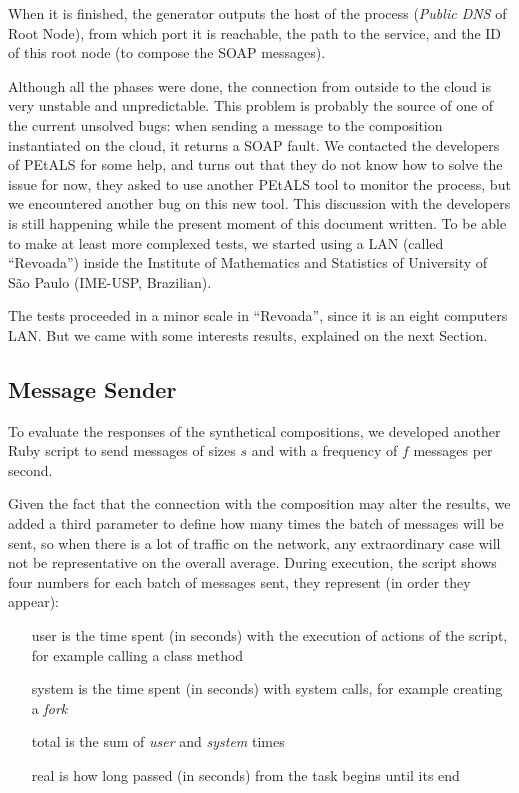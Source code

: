 When it is finished, the generator outputs the host of the process (\emph{Public DNS} of Root Node), from which port it is reachable, the path to the service, and the ID of this root node (to compose the SOAP messages).

Although all the phases were done, the connection from outside to the cloud is very unstable and unpredictable. This problem is probably the source of one of the current unsolved bugs: when sending a message to the composition instantiated on the cloud, it returns a SOAP fault. We contacted the developers of PEtALS for some help, and turns out that they do not know how to solve the issue for now, they asked to use another PEtALS tool to monitor the process, but we encountered another bug on this new tool. This discussion with the developers is still happening while the present moment of this document written. To be able to make at least more complexed tests, we started using a LAN (called ``Revoada'') inside the Institute of Mathematics and Statistics of University of São Paulo (IME-USP, Brazilian).

The tests proceeded in a minor scale in ``Revoada'', since it is an eight computers LAN. But we came with some interests results, explained on the next Section.


\subsection{Message Sender}

To evaluate the responses of the synthetical compositions, we developed another Ruby script to send messages of sizes $s$ and with a frequency of $f$ messages per second.

Given the fact that the connection with the composition may alter the results, we added a third parameter to define how many times the batch of messages will be sent, so when there is a lot of traffic on the network, any extraordinary case will not be representative on the overall average. During execution, the script shows four numbers for each batch of messages sent, they represent (in order they appear):

\begin{itemize} 
	\item[user] is the time spent (in seconds) with the execution of actions of the script, for example calling a class method
	\item[system] is the time spent (in seconds) with system calls, for example creating a \emph{fork}
	\item[total] is the sum of \emph{user} and \emph{system} times
	\item[real] is how long passed (in seconds) from the task begins until its end
\end{itemize}

